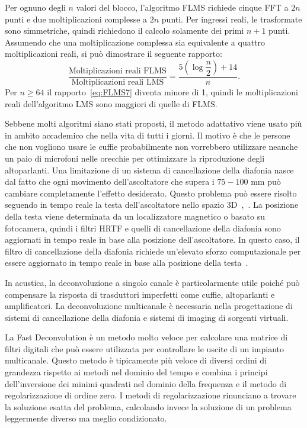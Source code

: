 \documentclass[12pt,a4paper,titlepage]{article}
\begin{document}
Per ognuno degli $n$ valori del blocco, l'algoritmo FLMS richiede cinque FFT a $2n$ punti e due moltiplicazioni complesse a $2n$ punti. Per ingressi reali, le trasformate sono simmetriche, quindi richiedono il calcolo solamente dei primi $n+1$ punti. Assumendo che una moltiplicazione complessa sia equivalente a quattro moltiplicazioni reali, si può dimostrare il seguente rapporto:
\begin{equation}\label{eq:FLMS7}
\dfrac{\text{Moltiplicazioni reali FLMS}}{\text{Moltiplicazioni reali LMS}} = \dfrac{5\left(\log\dfrac{n}{2}\right)+14}{n}.
\end{equation}
Per $n \geq 64$ il rapporto~\eqref{eq:FLMS7} diventa minore di 1, quindi le moltiplicazioni reali dell'algoritmo LMS sono maggiori di quelle di FLMS.

Sebbene molti algoritmi siano stati proposti, il metodo adattativo viene usato più in ambito accademico che nella vita di tutti i giorni. Il motivo è che le persone che non vogliono usare le cuffie probabilmente non vorrebbero utilizzare neanche un paio di microfoni nelle orecchie per ottimizzare la riproduzione degli altoparlanti. Una limitazione di un sistema di cancellazione della diafonia nasce dal fatto che ogni movimento dell'ascoltatore che supera i $75-100$ \si{\milli \meter} può cambiare completamente l'effetto desiderato. Questo problema può essere risolto seguendo in tempo reale la testa dell'ascoltatore nello spazio 3D~\cite{Bai:objective_analysis},~\cite{Kyriakakis:fundamental_technological_limitations}. La posizione della testa viene determinata da un localizzatore magnetico o basato su fotocamera, quindi i filtri HRTF e quelli di cancellazione della diafonia sono aggiornati in tempo reale in base alla posizione dell'ascoltatore. In questo caso, il filtro di cancellazione della diafonia richiede un'elevato sforzo computazionale per essere aggiornato in tempo reale in base alla posizione della testa~\cite{wand:a_stereo_crosstalk}. 

In acustica, la deconvoluzione a singolo canale è particolarmente utile poiché può compensare la risposta di trasduttori imperfetti come cuffie, altoparlanti e amplificatori. La deconvoluzione multicanale è necessaria nella progettazione di sistemi di cancellazione della diafonia e sistemi di imaging di sorgenti virtuali.%

La Fast Deconvolution è un metodo molto veloce per calcolare una matrice di filtri digitali che può essere utilizzata per controllare le uscite di un impianto multicanale. Questo metodo è tipicamente più veloce di diversi ordini di grandezza rispetto ai metodi nel dominio del tempo e combina i principi dell'inversione dei minimi quadrati nel dominio della frequenza e il metodo di regolarizzazione di ordine zero. I metodi di regolarizzazione rinunciano a trovare la soluzione esatta del problema, calcolando invece la soluzione di un problema leggermente diverso ma meglio condizionato. %
\end{document}
